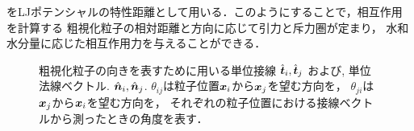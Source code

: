 をLJポテンシャルの特性距離として用いる．このようにすることで，相互作用を計算する
粗視化粒子の相対距離と方向に応じて引力と斥力圏が定まり，
水和水分量に応じた相互作用力を与えることができる．
\begin{figure}[h]
	\begin{center}
	\end{center}
	\caption{
		粗視化粒子の向きを表すために用いる単位接線
		$\hat{\mbox{\boldmath $t$}}_i,\hat{\mbox{\boldmath $t$}}_j$
		および, 単位法線ベクトル.
		$\hat{\mbox{\boldmath $n$}}_i,\hat{\mbox{\boldmath $n$}}_j$. 
		$\theta_{ij}$は粒子位置$\mbox{\boldmath $x$}_i$から$\mbox{\boldmath $x$}_j$を望む方向を，
		$\theta_{ji}$は$\mbox{\boldmath $x$}_j$から$\mbox{\boldmath $x$}_i$を望む方向を，
		それぞれの粒子位置における接線ベクトルから測ったときの角度を表す．
	} 
	\label{fig:fig9}
\end{figure}
